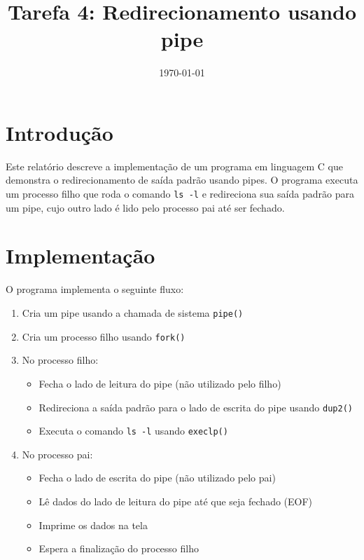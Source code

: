 \documentclass[12pt]{article}
\title{Tarefa 4: Redirecionamento usando pipe}
\author{}
\date{\today}
\begin{document}
\maketitle

\section{Introdução}

Este relatório descreve a implementação de um programa em linguagem C que demonstra o redirecionamento de saída padrão usando pipes. O programa executa um processo filho que roda o comando \texttt{ls -l} e redireciona sua saída padrão para um pipe, cujo outro lado é lido pelo processo pai até ser fechado.

\section{Implementação}

O programa implementa o seguinte fluxo:

\begin{enumerate}
    \item Cria um pipe usando a chamada de sistema \texttt{pipe()}
    \item Cria um processo filho usando \texttt{fork()}
    \item No processo filho:
        \begin{itemize}
            \item Fecha o lado de leitura do pipe (não utilizado pelo filho)
            \item Redireciona a saída padrão para o lado de escrita do pipe usando \texttt{dup2()}
            \item Executa o comando \texttt{ls -l} usando \texttt{execlp()}
        \end{itemize}
    \item No processo pai:
        \begin{itemize}
            \item Fecha o lado de escrita do pipe (não utilizado pelo pai)
            \item Lê dados do lado de leitura do pipe até que seja fechado (EOF)
            \item Imprime os dados na tela
            \item Espera a finalização do processo filho
        \end{itemize}
\end{enumerate}
\end{document}
